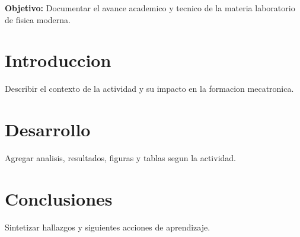 \documentclass[spanish,letterpaper,oneside]{article}
\begin{document}
\templatePortrait
\templatePagecfg
\onehalfspacing

\begin{abstractd}
\textbf{Objetivo:} Documentar el avance academico y tecnico de la materia laboratorio de fisica moderna.
\end{abstractd}

\templateIndex
\templateFinalcfg

\section{Introduccion}
Describir el contexto de la actividad y su impacto en la formacion mecatronica.

\section{Desarrollo}
Agregar analisis, resultados, figuras y tablas segun la actividad.

\section{Conclusiones}
Sintetizar hallazgos y siguientes acciones de aprendizaje.



\end{document}
